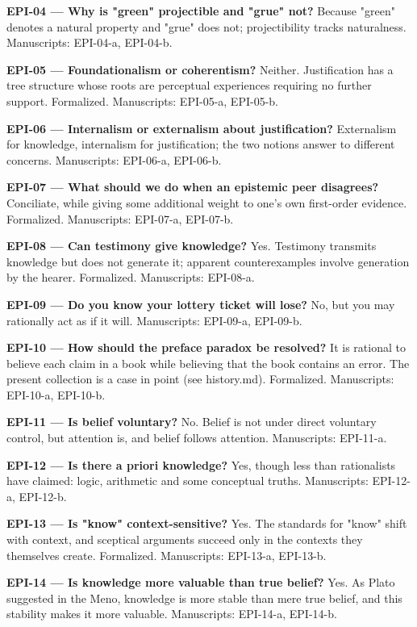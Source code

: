 \documentclass[10pt]{article}
\begin{document}
\textbf{EPI-04 --- Why is "green" projectible and "grue" not?} Because "green" denotes a natural property and "grue" does not; projectibility tracks naturalness. Manuscripts: EPI-04-a, EPI-04-b.

\textbf{EPI-05 --- Foundationalism or coherentism?} Neither. Justification has a tree structure whose roots are perceptual experiences requiring no further support. Formalized. Manuscripts: EPI-05-a, EPI-05-b.

\textbf{EPI-06 --- Internalism or externalism about justification?} Externalism for knowledge, internalism for justification; the two notions answer to different concerns. Manuscripts: EPI-06-a, EPI-06-b.

\textbf{EPI-07 --- What should we do when an epistemic peer disagrees?} Conciliate, while giving some additional weight to one's own first-order evidence. Formalized. Manuscripts: EPI-07-a, EPI-07-b.

\textbf{EPI-08 --- Can testimony give knowledge?} Yes. Testimony transmits knowledge but does not generate it; apparent counterexamples involve generation by the hearer. Formalized. Manuscripts: EPI-08-a.

\textbf{EPI-09 --- Do you know your lottery ticket will lose?} No, but you may rationally act as if it will. Manuscripts: EPI-09-a, EPI-09-b.

\textbf{EPI-10 --- How should the preface paradox be resolved?} It is rational to believe each claim in a book while believing that the book contains an error. The present collection is a case in point (see history.md). Formalized. Manuscripts: EPI-10-a, EPI-10-b.

\textbf{EPI-11 --- Is belief voluntary?} No. Belief is not under direct voluntary control, but attention is, and belief follows attention. Manuscripts: EPI-11-a.

\textbf{EPI-12 --- Is there a priori knowledge?} Yes, though less than rationalists have claimed: logic, arithmetic and some conceptual truths. Manuscripts: EPI-12-a, EPI-12-b.

\textbf{EPI-13 --- Is "know" context-sensitive?} Yes. The standards for "know" shift with context, and sceptical arguments succeed only in the contexts they themselves create. Formalized. Manuscripts: EPI-13-a, EPI-13-b.

\textbf{EPI-14 --- Is knowledge more valuable than true belief?} Yes. As Plato suggested in the Meno, knowledge is more stable than mere true belief, and this stability makes it more valuable. Manuscripts: EPI-14-a, EPI-14-b.
\end{document}

